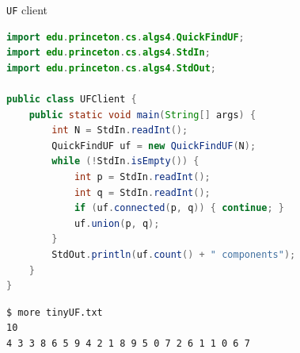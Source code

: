 \documentclass[8pt,a4paper,compress]{beamer}
\begin{document}
\begin{frame}[fragile]
\begin{minipage}{250pt}

\smallskip

\lstinline{UF} client
\begin{lstlisting}[language=Java]
import edu.princeton.cs.algs4.QuickFindUF;
import edu.princeton.cs.algs4.StdIn;
import edu.princeton.cs.algs4.StdOut;

public class UFClient {
    public static void main(String[] args) {
        int N = StdIn.readInt();
        QuickFindUF uf = new QuickFindUF(N);
        while (!StdIn.isEmpty()) {
            int p = StdIn.readInt();
            int q = StdIn.readInt();
            if (uf.connected(p, q)) { continue; }
            uf.union(p, q);
        }
        StdOut.println(uf.count() + " components");
    }
}
\end{lstlisting}
    
\begin{lstlisting}[language={}]
$ more tinyUF.txt
10
4 3 3 8 6 5 9 4 2 1 8 9 5 0 7 2 6 1 1 0 6 7
\end{lstlisting}    


\end{minipage}
\end{frame}
\end{document}
